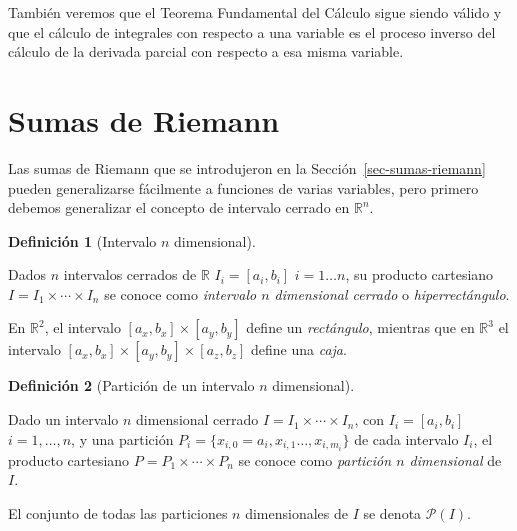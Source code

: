 \documentclass[
  a4paper,
]{scrreport}
\theoremstyle{plain}
\theoremstyle{definition}
\theoremstyle{plain}
\theoremstyle{plain}
\theoremstyle{definition}
\theoremstyle{definition}
\newtheorem{definition}{Definición}[chapter]
\theoremstyle{remark}
\begin{document}
También veremos que el Teorema Fundamental del Cálculo sigue siendo
válido y que el cálculo de integrales con respecto a una variable es el
proceso inverso del cálculo de la derivada parcial con respecto a esa
misma variable.

\section{Sumas de Riemann}\label{sumas-de-riemann}

Las sumas de Riemann que se introdujeron en la
Sección~\ref{sec-sumas-riemann} pueden generalizarse fácilmente a
funciones de varias variables, pero primero debemos generalizar el
concepto de intervalo cerrado en \(\mathbb{R}^n\).

\begin{definition}[Intervalo \(n\)
dimensional]\protect\hypertarget{def-intervalo-n-dimensional-cerrado}{}\label{def-intervalo-n-dimensional-cerrado}

Dados \(n\) intervalos cerrados de \(\mathbb{R}\) \(I_i=[a_i,b_i]\)
\(i=1\ldots n\), su producto cartesiano
\(I = I_1\times \cdots \times I_n\) se conoce como \emph{intervalo \(n\)
dimensional cerrado} o \emph{hiperrectángulo}.

\end{definition}

\begin{tcolorbox}[enhanced jigsaw, titlerule=0mm, arc=.35mm, colframe=quarto-callout-note-color-frame, bottomrule=.15mm, opacitybacktitle=0.6, rightrule=.15mm, coltitle=black, colback=white, toprule=.15mm, title=\textcolor{quarto-callout-note-color}{\faInfo}\hspace{0.5em}{Nota}, leftrule=.75mm, bottomtitle=1mm, opacityback=0, breakable, colbacktitle=quarto-callout-note-color!10!white, toptitle=1mm, left=2mm]

En \(\mathbb{R}^2\), el intervalo \([a_x,b_x]\times [a_y,b_y]\) define
un \emph{rectángulo}, mientras que en \(\mathbb{R}^3\) el intervalo
\([a_x,b_x]\times [a_y,b_y]\times [a_z,b_z]\) define una \emph{caja}.

\end{tcolorbox}

\begin{definition}[Partición de un intervalo \(n\)
dimensional]\protect\hypertarget{def-particion-n-dimensional}{}\label{def-particion-n-dimensional}

Dado un intervalo \(n\) dimensional cerrado
\(I=I_1\times\cdots\times I_n\), con \(I_i=[a_i,b_i]\) \(i=1,\ldots,n\),
y una partición \(P_i=\{x_{i,0}=a_i,x_{i,1}\ldots,x_{i,m_i}\}\) de cada
intervalo \(I_i\), el producto cartesiano
\(P=P_1\times\cdots\times P_n\) se conoce como \emph{partición \(n\)
dimensional} de \(I\).

El conjunto de todas las particiones \(n\) dimensionales de \(I\) se
denota \(\mathcal{P}(I)\).

\end{definition}
\end{document}
